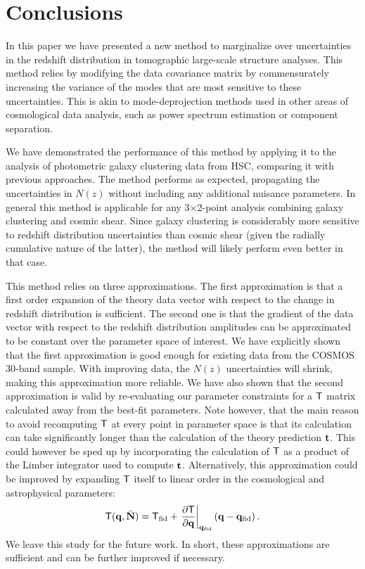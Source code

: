 \documentclass[a4paper,11pt]{article}
\newcommand{\vN}{\mathbf{N}}
\begin{document}
  \section{Conclusions}\label{sec:conclusions}
    In this paper we have presented a new method to marginalize over uncertainties in the redshift distribution in tomographic large-scale structure analyses. This method relies by modifying the data covariance matrix by commensurately increasing the variance of the modes that are most sensitive to these uncertainties. This is akin to mode-deprojection methods used in other areas of cosmological data analysis, such as power spectrum estimation or component separation.

    We have demonstrated the performance of this method by applying it to the analysis of photometric galaxy clustering data from HSC, comparing it with previous approaches. The method performs as expected, propagating the uncertainties in $N(z)$ without including any additional nuisance parameters. In general this method is applicable for any 3$\times$2-point analysis combining galaxy clustering and cosmic shear. Since galaxy clustering is considerably more sensitive to redshift distribution uncertainties than cosmic shear (given the radially cumulative nature of the latter), the method will likely perform even better in that case.
    
    This method relies on three approximations. The first approximation is that a first order expansion of the theory data vector with respect to the change in redshift distribution is sufficient. The second one is that the gradient of the data vector with respect to the redshift distribution amplitudes can be approximated to be constant over the parameter space of interest. We have explicitly shown that the first approximation is good enough for existing data from the COSMOS 30-band sample. With improving data, the $N(z)$ uncertainties will shrink, making this approximation more reliable. We have also shown that the second approximation is valid by re-evaluating our parameter constraints for a ${\sf T}$ matrix calculated away from the best-fit parameters. Note however, that the main reason to avoid recomputing ${\sf T}$ at every point in parameter space is that its calculation can take significantly longer than the calculation of the theory prediction ${\bf t}$. This could however be sped up by incorporating the calculation of ${\sf T}$ as a product of the Limber integrator used to compute ${\bf t}$. Alternatively, this approximation could be improved by expanding ${\sf T}$ itself to linear order in the cosmological and astrophysical parameters:
    \begin{equation}
      {\sf T} ({{\bf q},\bar{\vN}}) = {\sf T}_{\rm fid} + \left. \frac{\partial \sf T}{\partial {\bf q}}\right|_{{\bf q_{\rm fid}}} \left({\bf q} - {\bf q_{\rm fid}}\right). \label{eq:Tmatd}
    \end{equation}
    We leave this study for the future work. In short, these approximations are sufficient and can be further improved if necessary.
\end{document}
